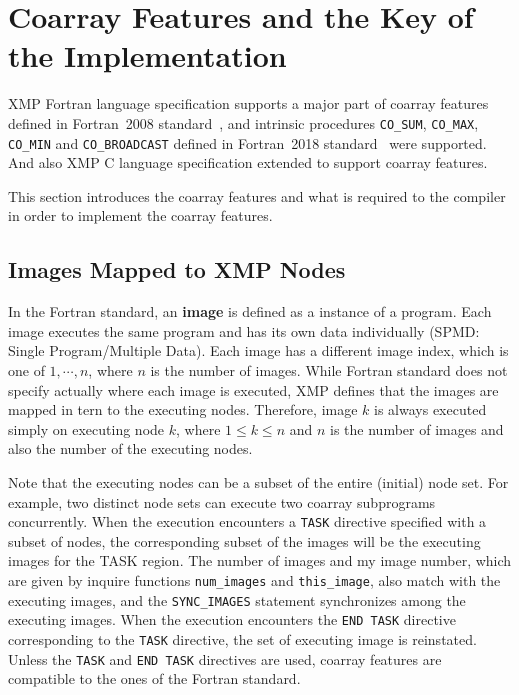 \section{Coarray Features and the Key of the Implementation}\label{sec:lang}

XMP Fortran language specification supports a major part of coarray features defined in 
Fortran~2008 standard~\cite{F08}, and intrinsic procedures 
{\tt CO\_SUM}, {\tt CO\_MAX}, {\tt CO\_MIN} and {\tt CO\_BROADCAST} defined in 
Fortran~2018 standard~\cite{F18} were supported.
And also XMP C language specification extended to support coarray features.

This section introduces the coarray features and what is required
to the compiler in order to implement the coarray features.


\subsection{Images Mapped to XMP Nodes}

In the Fortran standard, an {\bf image} is defined as a instance of a program. 
Each image executes the same program and has its own data individually 
(SPMD: Single Program/Multiple Data).
Each image has a different image index, which is one of $1, \cdots, n$, 
where $n$ is the number of images. 
While Fortran standard does not specify actually where each image is executed, 
XMP defines that the images are mapped in tern to the executing nodes. 
Therefore, image $k$ is always executed simply on executing node $k$, 
where $1 \leq k \leq n$ and 
$n$ is the number of images and also the number of the executing nodes. 

Note that the executing nodes can be a subset of the entire (initial) node set. 
For example, two distinct node sets can execute two coarray subprograms concurrently.
When the execution encounters a {\tt TASK} directive specified with a subset of nodes,
the corresponding subset of the images will be the executing images for the
TASK region. 
The number of images and my image number, which are given by inquire functions
{\tt num\_images} and {\tt this\_image}, also match with the executing images, and
the {\tt SYNC\_IMAGES} statement synchronizes among the executing images.
When the execution encounters the {\tt END TASK} directive corresponding to the
{\tt TASK} directive, the set of executing image is reinstated.
Unless the {\tt TASK} and {\tt END TASK} directives are used, coarray features are 
compatible to the ones of the Fortran standard. 

